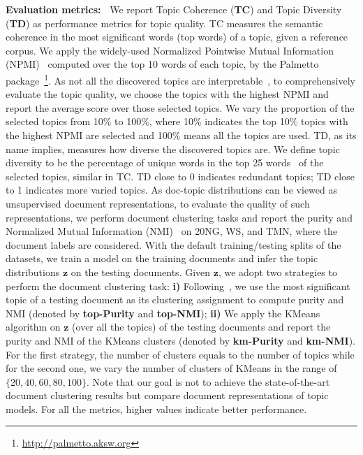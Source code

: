 \documentclass{article}
\renewcommand{\vec}{\boldsymbol}
\begin{document}
\textbf{Evaluation metrics:~}
We report Topic Coherence (\textbf{TC}) and Topic Diversity (\textbf{TD}) as performance metrics for topic quality.
TC measures the semantic coherence in the most significant words (top words) of a topic, given a reference corpus.
We apply the widely-used Normalized Pointwise Mutual Information (NPMI)~\citep{aletras2013evaluating,lau2014machine} computed over the top 10 words of each topic, by the Palmetto package~\citep{roder2015exploring}\footnote{\url{http://palmetto.aksw.org}}.
As not all the discovered topics are interpretable~\citep{yang2015efficient,zhao2018dirichlet}, to comprehensively evaluate the topic quality,
we choose the topics with the highest NPMI and report the average score over those selected topics.
We vary the proportion of the selected topics from 10\% to 100\%, where 10\% indicates the top 10\% topics with the highest NPMI are selected and 100\% means all the topics are used.
TD, as its name implies, measures how diverse the discovered topics are. We define topic diversity to be the percentage of unique words in the top 25 words~\citep{dieng2019topic} of the selected topics, similar in TC. TD close to 0 indicates redundant topics; TD close to 1 indicates more varied topics.
As doc-topic distributions can be viewed as unsupervised document representations, to evaluate the quality of such representations, we perform document clustering tasks and report the purity and Normalized Mutual Information (NMI)~\citep{manning2008introduction} on 20NG, WS, and TMN, where the document labels are considered. With the default training/testing splits of the datasets, we train a model on the training documents and infer the topic distributions $\vec{z}$ on the testing documents. Given $\vec{z}$, we adopt two strategies to perform the document clustering task: \textbf{i)} Following~\citet{nguyen2015improving}, we use the most significant topic of a testing document as its clustering assignment to compute purity and NMI (denoted by \textbf{top-Purity} and \textbf{top-NMI}); \textbf{ii)} We apply the KMeans algorithm on $\vec{z}$ (over all the topics) of the testing documents and report the purity and NMI of the KMeans clusters (denoted by \textbf{km-Purity} and \textbf{km-NMI}). For the first strategy, the number of clusters equals to the number of topics while for the second one, we vary the number of clusters of KMeans in the range of $\{20, 40, 60, 80, 100\}$. Note that our goal is not to achieve the state-of-the-art document clustering results but compare document representations of topic models. For all the metrics, higher values indicate better performance. 
\end{document}

